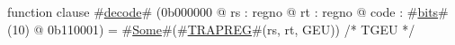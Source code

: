 function clause #\hyperref[zdecode]{decode}# (0b000000 @ rs : regno @ rt : regno @ code : #\hyperref[zbits]{bits}#(10) @ 0b110001) =
  #\hyperref[zSome]{Some}#(#\hyperref[zTRAPREG]{TRAPREG}#(rs, rt, GEU)) /* TGEU */
